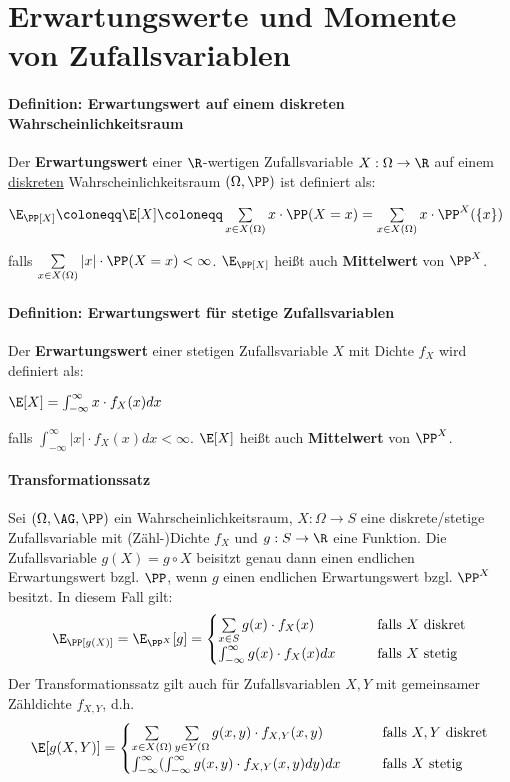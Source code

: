 \section{Erwartungswerte und Momente von Zufallsvariablen}
\paragraph{Definition: Erwartungswert auf einem diskreten Wahrscheinlichkeitsraum}
Der \textbf{Erwartungswert} einer $\R$-wertigen Zufallsvariable $X:\Omega\rightarrow\R$ auf einem \underline{diskreten} Wahrscheinlichkeitsraum $(\Omega,\PP)$ ist definiert als:
\begin{tightcenter}
	$\E_\PP[X]\coloneqq\E[X]\coloneqq\sum\limits_{x\in X(\Omega)}x\cdot \PP(X=x)=\sum\limits_{x\in X(\Omega)}x\cdot\PP^X(\{x\})$
\end{tightcenter}
falls $\sum\limits_{x\in X(\Omega)}|x|\cdot\PP(X=x)<\infty$.
$\E_\PP[X]$ heißt auch \textbf{Mittelwert} von $\PP^X$.

\paragraph{Definition: Erwartungswert für stetige Zufallsvariablen}
Der \textbf{Erwartungswert} einer stetigen Zufallsvariable $X$ mit Dichte $f_X$ wird definiert als:
\begin{tightcenter}
	$\E[X]=\int_{-\infty}^{\infty}x\cdot f_X(x)dx$
\end{tightcenter}
falls $\int_{-\infty}^{\infty}|x|\cdot f_X(x)dx<\infty$.
$\E[X]$ heißt auch \textbf{Mittelwert} von $\PP^X$.

\paragraph{Transformationssatz}
Sei $(\Omega,\AG,\PP)$ ein Wahrscheinlichkeitsraum, $X:\Omega\rightarrow S$ eine diskrete/stetige Zufallsvariable mit (Zähl-)Dichte $f_X$ und $g:S\rightarrow\R$ eine Funktion.
Die Zufallsvariable $g(X)=g\circ X$ beisitzt genau dann einen endlichen Erwartungswert bzgl. $\PP$, wenn $g$ einen endlichen Erwartungswert bzgl. $\PP^X$ besitzt.
In diesem Fall gilt:
\[   
\E_\PP[g(X)]=\E_{\PP^X}[g]=
\begin{cases}
	\sum\limits_{x\in S}g(x)\cdot f_X(x) & \qquad\text{falls $X$ diskret}\\
	\int_{-\infty}^{\infty}g(x)\cdot f_X(x)dx & \qquad\text{falls $X$ stetig}
\end{cases}
\]
Der Transformationssatz gilt auch für Zufallsvariablen $X,Y$ mit gemeinsamer Zähldichte $f_{X,Y}$, d.h.
\[   
\E[g(X,Y)]=
\begin{cases}
	\sum\limits_{x\in X(\Omega)}\sum\limits_{y\in Y(\Omega}g(x,y)\cdot f_{X,Y}(x,y) & \qquad\text{falls $X,Y$ diskret}\\
	\int_{-\infty}^{\infty}(\int_{-\infty}^{\infty}g(x,y)\cdot f_{X,Y}(x,y)dy)dx & \qquad\text{falls $X$ stetig}
\end{cases}
\]

